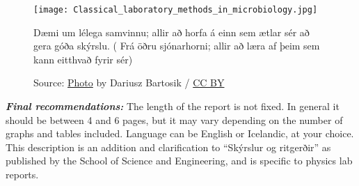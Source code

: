 \documentclass{scrartcl}
\begin{document}
\begin{figure}[h]
    \centering
    \texttt{[image: Classical\_laboratory\_methods\_in\_microbiology.jpg]}
    \caption{Dæmi um lélega samvinnu; allir að horfa á einn sem ætlar sér að gera góða skýrslu. ( Frá öðru sjónarhorni; allir að læra af þeim sem kann eitthvað fyrir sér)}
    \caption*{Source: \href{https://commons.wikimedia.org/wiki/File:Classical_laboratory_methods_in_microbiology.jpg}{Photo} by Dariusz Bartosik / \href{https://creativecommons.org/licenses/by/2.0/}{CC BY}}
    \label{fig:Þessi_mynd}
\end{figure}

\textbf{\textit{Final recommendations:}} 
The length of the report is not fixed.
In general it should be between 4 and 6 pages, but it may vary depending on the number of graphs and tables included.
Language can be English or Icelandic, at your choice.
This description is an addition and clarification to “Skýrslur og ritgerðir” as published by the School of Science and Engineering, and is specific to physics lab reports.

\newpage
\printbibliography

\end{document}

